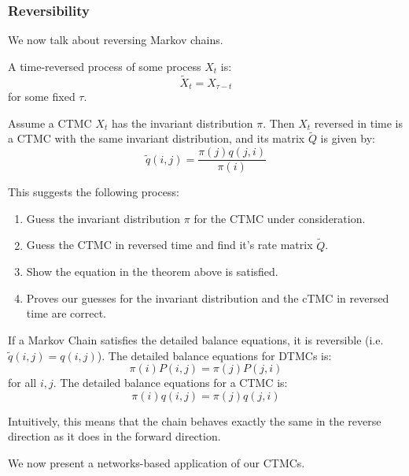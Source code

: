 \subsubsection{Reversibility}
We now talk about reversing Markov chains.

\begin{definition}
    A time-reversed process of some process $X_t$ is:
    \[ \tilde{X}_t = X_{\tau - t} \]
    for some fixed $\tau$.
\end{definition}

\begin{theorem}
    Assume a CTMC $X_t$ has the invariant distribution $\pi$. Then $X_t$ reversed in time is a CTMC
    with the same invariant distribution, and its matrix $\tilde{Q}$ is given by:
    \[ \tilde{q}(i, j) = \frac{\pi(j) q(j, i)}{\pi(i)} \]
\end{theorem}

This suggests the following process:
\begin{enumerate}
    \item Guess the invariant distribution $\pi$ for the CTMC under consideration.
    \item Guess the CTMC in reversed time and find it's rate matrix $\tilde{Q}$.
    \item Show the equation in the theorem above is satisfied.
    \item Proves our guesses for the invariant distribution and the cTMC in reversed time are correct.
\end{enumerate}

\begin{definition}[Reversibility]
    If a Markov Chain satisfies the detailed balance equations, it is reversible (i.e. $\tilde{q}(i, j) = q(i, j)$). The detailed balance equations for DTMCs is:
    \[ \pi(i) P(i, j) = \pi(j) P(j, i) \]
    for all $i, j$.
    The detailed balance equations for a CTMC is:
    \[ \pi(i) q(i, j) = \pi(j) q(j, i) \]

    Intuitively, this means that the chain behaves exactly the same in the reverse direction as it does in the forward direction.
\end{definition}

We now present a networks-based application of our CTMCs.

